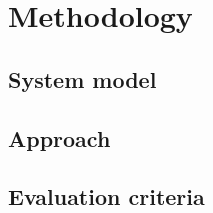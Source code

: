 \chapter{Methodology}
\label{ch:methodology}

\section{System model}
\label{sec:meth-system-model}

\section{Approach}
\label{sec:meth-approach}

\section{Evaluation criteria}
\label{sec:meth-evaluation}

